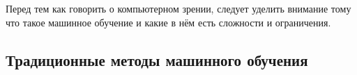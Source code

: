 Перед тем как говорить о компьютерном зрении, следует уделить внимание тому что такое машинное обучение и какие в нём есть сложности и ограничения.

%


\subsection{Традиционные методы машинного обучения}

